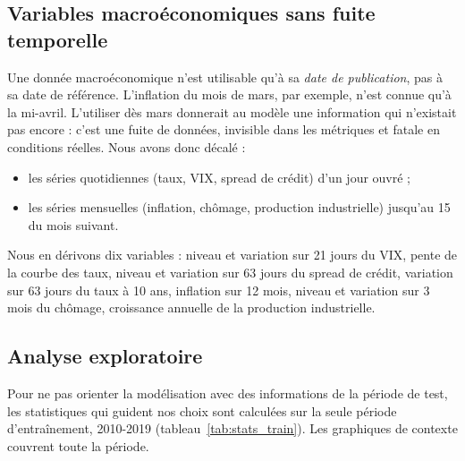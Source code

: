 \subsection{Variables macroéconomiques sans fuite temporelle}

Une donnée macroéconomique n'est utilisable qu'à sa \emph{date de publication}, pas à sa date de référence. L'inflation du mois de mars, par exemple, n'est connue qu'à la mi-avril. L'utiliser dès mars donnerait au modèle une information qui n'existait pas encore : c'est une fuite de données, invisible dans les métriques et fatale en conditions réelles. Nous avons donc décalé :
\begin{itemize}
  \item les séries quotidiennes (taux, VIX, spread de crédit) d'un jour ouvré ;
  \item les séries mensuelles (inflation, chômage, production industrielle) jusqu'au 15 du mois suivant.
\end{itemize}
Nous en dérivons dix variables : niveau et variation sur 21 jours du VIX, pente de la courbe des taux, niveau et variation sur 63 jours du spread de crédit, variation sur 63 jours du taux à 10 ans, inflation sur 12 mois, niveau et variation sur 3 mois du chômage, croissance annuelle de la production industrielle.

\subsection{Analyse exploratoire}

Pour ne pas orienter la modélisation avec des informations de la période de test, les statistiques qui guident nos choix sont calculées sur la seule période d'entraînement, 2010-2019 (tableau~\ref{tab:stats_train}). Les graphiques de contexte couvrent toute la période.

